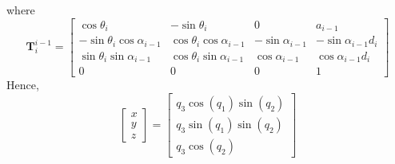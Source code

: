 where 
\begin{equation*}
	\bm{T}_{i}^{i-1}=\left[\begin{array}{cccc}
		\cos \theta_i & -\sin \theta_i & 0 & a_{i-1} \\
		-\sin \theta_i \cos \alpha_{i-1} & \cos \theta_i \cos \alpha_{i-1} & -\sin \alpha_{i-1} & -\sin \alpha_{i-1} d_i \\
		\sin \theta_i \sin \alpha_{i-1} & \cos \theta_i \sin \alpha_{i-1} & \cos \alpha_{i-1} & \cos \alpha_{i-1} d_i \\
		0 & 0 & 0 & 1
	\end{array}\right]
\end{equation*}
Hence, 
\begin{equation}
	\begin{bmatrix}
		x\\
		y\\
		z
	\end{bmatrix} = \begin{bmatrix}
	q_3\cos\left(q_1\right)\sin\left(q_2\right)\\
	q_3\sin\left(q_1\right)\sin\left(q_2\right)\\
	q_3\cos\left(q_2\right)
\end{bmatrix}
\label{eq:fwdKin}
\end{equation}

